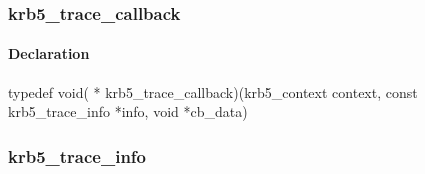 \documentclass[letterpaper,10pt,english]{sphinxmanual}
\begin{document}

\begin{fulllineitems}
\label{appdev/refs/types/krb5_tkt_authent:c.krb5_tkt_authent.authenticator}
\end{fulllineitems}


\begin{fulllineitems}
\label{appdev/refs/types/krb5_tkt_authent:c.krb5_tkt_authent.ap_options}
\end{fulllineitems}



\subsubsection{krb5\_trace\_callback}
\label{appdev/refs/types/krb5_trace_callback:krb5-trace-callback-struct}\label{appdev/refs/types/krb5_trace_callback:krb5-trace-callback}\label{appdev/refs/types/krb5_trace_callback::doc}

\begin{fulllineitems}
\label{appdev/refs/types/krb5_trace_callback:c.krb5_trace_callback}
\end{fulllineitems}



\paragraph{Declaration}
\label{appdev/refs/types/krb5_trace_callback:declaration}
typedef void( * krb5\_trace\_callback)(krb5\_context context, const krb5\_trace\_info *info, void *cb\_data)


\subsubsection{krb5\_trace\_info}
\label{appdev/refs/types/krb5_trace_info:krb5-trace-info-struct}\label{appdev/refs/types/krb5_trace_info::doc}\label{appdev/refs/types/krb5_trace_info:krb5-trace-info}
\end{document}
